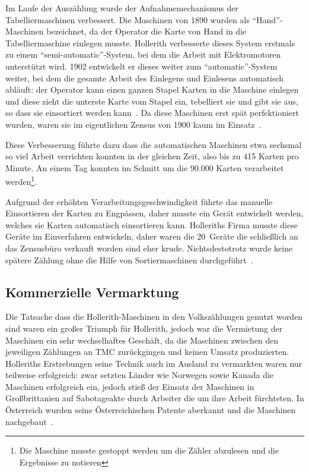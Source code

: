 \documentclass[parskip=half]{scrartcl}
\begin{document}
Im Laufe der Auszählung wurde der Aufnahmemechanismus der Tabelliermaschinen
verbessert. Die Maschinen von 1890 wurden als \enquote{Hand}-Maschinen
bezeichnet, da der Operator die Karte von Hand in die Tabelliermaschine
einlegen musste. Hollerith verbesserte dieses System erstmals zu einem
\enquote{semi-automatic}-System, bei dem die Arbeit mit Elektromotoren
unterstützt wird. 1902 entwickelt er dieses weiter zum
\enquote{automatic}-System weiter, bei dem die gesamte Arbeit des Einlegens und
Einlesens automatisch abläuft: der Operator kann einen ganzen Stapel Karten in
die Maschine einlegen und diese zieht die unterste Karte vom Stapel ein,
tebelliert sie und gibt sie aus, so dass sie einsortiert werden
kann~\cite{austrian1982herman}. Da diese Maschinen erst spät perfektioniert
wurden, waren sie im eigentlichen Zensus von 1900 kaum im
Einsatz~\cite{truesdell1965development}.

Diese Verbesserung führte dazu dass die automatischen Maschinen etwa sechsmal
so viel Arbeit verrichten konnten in der gleichen Zeit, also bis zu 415 Karten
pro Minute. An einem Tag konnten im Schnitt um die 90.000 Karten verarbeitet
werden\footnote{Die Maschine musste gestoppt werden um die Zähler abzulesen und
die Ergebnisse zu notieren}.

Aufgrund der erhöhten Verarbeitungsgeschwindigkeit führte das manuelle
Einsortieren der Karten zu Engpässen, daher musste ein Gerät entwickelt werden,
welches sie Karten automatisch einsortieren kann. Holleriths Firma musste diese
Geräte im Einverfahren entwickeln, daher waren die 20~Geräte die schließlich an
das Zensusbüro verkauft worden sind eher krude. Nichtsdestotrotz wurde keine
spätere Zählung ohne die Hilfe von Sortiermaschinen
durchgeführt~\cite{truesdell1965development}.

\subsection{Kommerzielle Vermarktung}
\label{sec:commerce}

Die Tatsache dass die Hollerith-Maschinen in den Volkszählungen genutzt worden
sind waren ein großer Triumph für Hollerith, jedoch war die Vermietung der
Maschinen ein sehr wechselhaftes Geschäft, da die Maschinen zwischen den
jeweiligen Zählungen an TMC zurückgingen und keinen Umsatz produzierten.
Holleriths Erstrebungen seine Technik auch im Ausland zu vermarkten waren nur
teilweise erfolgreich: zwar setzten Länder wie Norwegen sowie Kanada die
Maschinen erfolgreich ein, jedoch stieß der Einsatz der Maschinen in
Großbrittanien auf Sabotageakte durch Arbeiter die um ihre Arbeit fürchteten.
In Österreich wurden seine Österreichischen Patente aberkannt und die Maschinen
nachgebaut~\cite{austrian1982herman}.
\end{document}
